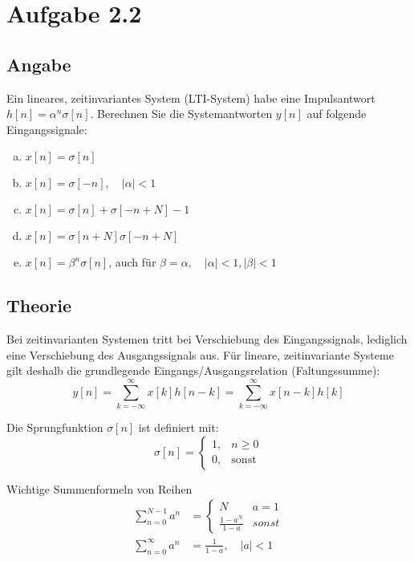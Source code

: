 \section*{Aufgabe 2.2}
\subsection*{Angabe}
	Ein lineares, zeitinvariantes System (LTI-System) habe eine Impulsantwort $h[n]=\alpha ^n \sigma [n]$. Berechnen Sie die Systemantworten $y[n]$ auf folgende Eingangssignale:
	\begin{enumerate}[a)]
		\item $x[n]=\sigma [n]$
		\item $x[n]=\sigma [-n], \quad |\alpha|<1$
		\item $x[n]=\sigma [n]+\sigma [-n+N]-1$
		\item $x[n]=\sigma [n+N]\sigma [-n+N]$
		\item $x[n]=\beta ^n \sigma [n]$, auch für $\beta = \alpha, \quad |\alpha|<1, |\beta| < 1$
	\end{enumerate}
\subsection*{Theorie}
	\begin{hint}
		Bei zeitinvarianten Systemen tritt bei Verschiebung des Eingangssignals, lediglich eine Verschiebung des Ausgangssignals aus. Für lineare, zeitinvariante Systeme gilt deshalb die grundlegende Eingangs/Ausgangsrelation (Faltungssumme):
		\[
			y[n] = \sum_{k=-\infty}^{\infty}x[k]h[n-k]=\sum_{k=-\infty}^{\infty}x[n-k]h[k]
		\]
	\end{hint}
	\begin{hint}
		Die Sprungfunktion $\sigma [n]$ ist definiert mit:
		\[
			\sigma [n] = \left\{ 
							\begin{array}{ll} 
								1, & n \ge 0 \\ 
								0, & \mbox{sonst} 
							\end{array}  
						 \right.
		\]
	\end{hint}
	\begin{hint}
		Wichtige Summenformeln von Reihen
		\begin{align*}
			\sum_{n=0}^{N-1}a^n &= \left\{ \begin{array}{ll} N & a=1\\ \frac{1-a^N}{1-a} & sonst \end{array} \right.\\
			\sum_{n=0}^{\infty}a^n &= \frac{1}{1-a},  \quad |a|<1
		\end{align*}
	\end{hint}

